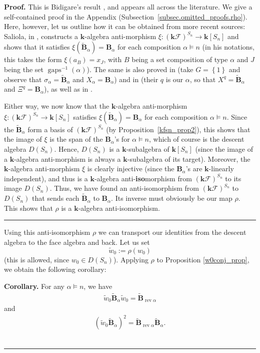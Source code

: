 \documentclass[12pt]{article}
\theoremstyle{definition}%
\newtheorem{cor}[thm]{Corollary}
\theoremstyle{definition}%
\theoremstyle{remark}%
\newcommand{\tup}[1]{\left( #1 \right)}
\newcommand{\set}[1]{\left\{ #1 \right\}}
\newcommand{\kk}{\mathbf{k}}
\newcommand{\ksn}{\kk\left[S_n\right]}
\newcommand{\kf}{\kk\mathcal{F}}
\newcommand{\kfsn}{\left(\kf\right)^{S_n}}
\newcommand{\dsn}{D\left(S_n\right)}
\newcommand{\BBa}{\mathbf{B}_{\alpha}}
\newcommand{\BBt}{\widetilde{\mathbf{B}}}
\newcommand{\BBta}{\widetilde{\mathbf{B}}_{\alpha}}
\newcommand{\wo}{w_0} %
\newcommand{\wotil}{\widetilde{w}_0}
\newcommand{\gaps}{\operatorname{gaps}}
\newcommand{\rev}{\operatorname{rev}}
\newenvironment{cor}[1][Corollary]{\noindent\textbf{#1.} }{\ \rule{0.5em}{0.5em}}
\newenvironment{proof}[1][Proof]{\noindent\textbf{#1.} }{\ \rule{0.5em}{0.5em}}
\begin{document}
\begin{proof}
    This is Bidigare's result \cite[Theorem 3.8.1]{Bidigare-thesis}, and appears all across the literature.
	We give a self-contained proof in the Appendix (Subsection~\ref{subsec.omitted_proofs.rho}).
    Here, however, let us outline how it can be obtained from more recent sources:
    Saliola, in \cite[proof of Theorem 2.1]{Saliola}, constructs a $\kk$-algebra anti-morphism $\xi : \kfsn \to \ksn$ and shows that it satisfies $\xi\tup{\BBta} = \BBa$ for each composition $\alpha \models n$ (in his notations, this takes the form $\xi\tup{a_B} = x_J$, with $B$ being a set composition of type $\alpha$ and $J$ being the set $\gaps^{-1}\tup{\alpha}$).
    The same is also proved in \cite[Theorem 1]{Hsiao} (take $G = \set{1}$ and observe that $\sigma_\alpha = \BBta$ and $X_\alpha = \BBa$) and in \cite[Appendix B, a few lines above Remark B.5]{BlessenohlSchocker} (their $q$ is our $\alpha$, so that $X^q = \BBta$ and $\Xi^q = \BBa$),
    as well as in \cite[Theorem 7]{Brown-SRM}.
	
	Either way, we now know that the $\kk$-algebra anti-morphism $\xi : \kfsn \to \ksn$ satisfies $\xi\tup{\BBta} = \BBa$ for each composition $\alpha \models n$.
    Since the $\BBta$ form a basis of $\kfsn$ (by Proposition~\ref{kfsn_prop2}), this shows that the image of $\xi$ is the span of the $\BBa$'s for $\alpha \models n$, which of course is the descent algebra $\dsn$.
	Hence, $\dsn$ is a $\kk$-subalgebra of $\ksn$ (since the image of a $\kk$-algebra anti-morphism is always a $\kk$-subalgebra of its target).
	Moreover, the $\kk$-algebra anti-morphism $\xi$ is clearly injective (since the $\BBa$'s are $\kk$-linearly independent), and thus is a $\kk$-algebra anti-\textbf{iso}morphism from $\kfsn$ to its image $\dsn$.
    Thus, we have found an anti-isomorphism from $\kfsn$ to $\dsn$ that sends each $\BBta$ to $\BBa$.
    Its inverse must obviously be our map $\rho$.
	This shows that $\rho$ is a $\kk$-algebra anti-isomorphism.
\end{proof}

Using this anti-isomorphism $\rho$ we can transport our identities from the descent algebra to the face algebra and back.
Let us set
\begin{equation}
\wotil := \rho\tup{\wo}
\label{eq.wotil=}
\end{equation}
(this is allowed, since $\wo \in \dsn$).
Applying $ \rho $ to Proposition \ref{w0conj_prop}, we obtain the following corollary:

\begin{cor}
    \label{w0conj_cor}
    For any $\alpha \models n$, we have
    \begin{align}
    \wotil \BBta \wotil = \BBt_{\rev \alpha}
    \label{eq.w0conj_cor.1}
    \end{align}
    and
    \begin{align}
    \tup{\wotil \BBta}^2 = \BBt_{\rev \alpha} \BBta .
    \label{eq.w0conj_cor.2}
    \end{align}
\end{cor}
\end{document}
